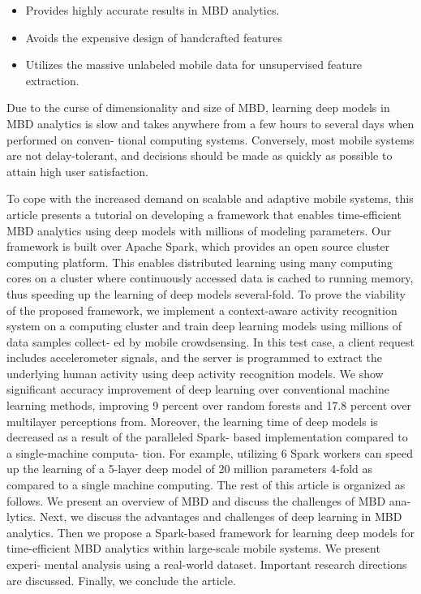 \documentclass[14pt, a4paper]{extarticle}
\begin{document}
\begin{itemize}
	\item{Provides highly accurate results in MBD analytics.}
    \item{Avoids the expensive design of handcrafted features}
    \item{Utilizes the massive unlabeled mobile data for unsupervised feature extraction.}
\end{itemize}


Due to the curse of dimensionality and size of MBD, learning
deep models in MBD analytics is slow and takes anywhere
from a few hours to several days when performed on conven-
tional computing systems. Conversely, most mobile systems are
not delay-tolerant, and decisions should be made as quickly as
possible to attain high user satisfaction.


To cope with the increased demand on scalable and adaptive
mobile systems, this article presents a tutorial on developing a
framework that enables time-efficient MBD analytics using deep
models with millions of modeling parameters. Our framework is
built over Apache Spark, which provides an open source
cluster computing platform. This enables distributed learning
using many computing cores on a cluster where continuously
accessed data is cached to running memory, thus speeding up
the learning of deep models several-fold. To prove the viability
of the proposed framework, we implement a context-aware
activity recognition system on a computing cluster and train
deep learning models using millions of data samples collect-
ed by mobile crowdsensing. In this test case, a client request
includes accelerometer signals, and the server is programmed
to extract the underlying human activity using deep activity
recognition models. We show significant accuracy improvement
of deep learning over conventional machine learning methods,
improving 9 percent over random forests and 17.8 percent over
multilayer perceptions from. Moreover, the learning time of
deep models is decreased as a result of the paralleled Spark-
based implementation compared to a single-machine computa-
tion. For example, utilizing 6 Spark workers can speed up the
learning of a 5-layer deep model of 20 million parameters 4-fold
as compared to a single machine computing.
The rest of this article is organized as follows. We present
an overview of MBD and discuss the challenges of MBD ana-
lytics. Next, we discuss the advantages and challenges of deep
learning in MBD analytics. Then we propose a Spark-based
framework for learning deep models for time-efficient MBD
analytics within large-scale mobile systems. We present experi-
mental analysis using a real-world dataset. Important research
directions are discussed. Finally, we conclude the article.
\end{document}
